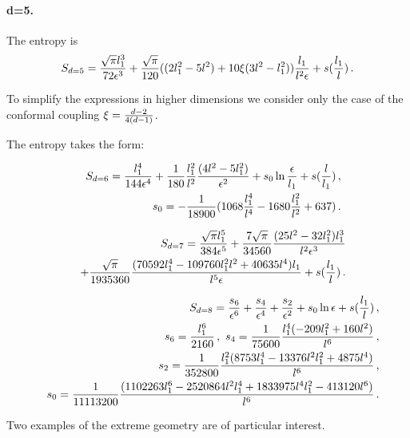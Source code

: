 \documentclass[12pt]{article}
\def\be{\begin{eqnarray}}
\def\ee{\end{eqnarray}}
\def\lb{\label}
\def\o{\over}
\begin{document}
\medskip

\paragraph{d=5.}  The entropy is
\be
S_{d=5}={\sqrt{\pi} l_1^3\o 72 \epsilon^3}+{\sqrt{\pi}\o 120}((2l_1^2 -5l^2)+10\xi (3l^2-l_1^2)){l_1\o l^2\epsilon}+s({l_1\o l})\, .
\lb{d=5 entropy}
\ee

\medskip

\noindent To simplify the expressions in higher dimensions  we consider only the case of the conformal coupling $\xi={d-2\o 4(d-1)}$.

\medskip

\noindent The entropy takes the form:

\medskip

\be
&&S_{d=6}={l_1^4\o 144\epsilon^4}+{1\o 180}{l_1^2\o l^2}{(4l^2-5l_1^2)\o \epsilon^2}+s_0\ln{\epsilon\o l_1}+s({l\o l_1})\, ,\nonumber \\
&&s_0=-{1\o 18900}(1068 {l_1^4\o l^4}-1680{l_1^2\o l^2}+637)\, .\lb{d=6 entropy}
\ee

\medskip

\be
&&S_{d=7}={\sqrt{\pi}l_1^5\o 384 \epsilon^5}+{7\sqrt{\pi}\o 34560}{(25l^2-32l_1^2)l_1^3\o l^2\epsilon^3} \nonumber \\
&&+{\sqrt{\pi}\o 1935360}{(70592 l_1^4-109760l_1^2l^2+40635l^4)l_1\o l^5\epsilon}+s({l_1\o l})\, .
\lb{d=7 entropy}
\ee

\medskip

\be
&&S_{d=8}={s_6\o \epsilon^6}+{s_4\o \epsilon^4}+{s_2\o \epsilon^2}+s_0\ln\epsilon +s({l_1\o l})\, , \lb{d=8 entropy}\\
&&s_6={l_1^6\o 2160}\, , \ s_4={1\o 75600}{l_1^4(-209l_1^2+160l^2)\o l^6}\, , \nonumber \\
&& s_2={1\o 352800}{l_1^2(8753l_1^4-13376 l^2l_1^2+4875l^4)\o l^6}\, ,   \nonumber\\
&&s_0={1\o 11113200}{(1102263 l_1^6-2520864l^2l_1^4+1833975l^4l_1^2-413120l^6)\o l^6}\, .
\ee

\bigskip

Two examples of the  extreme geometry  are of particular interest.

\medskip
\end{document}
